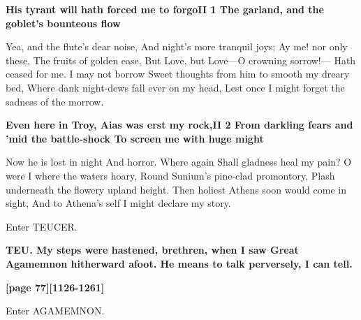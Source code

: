 \documentclass[11pt,letter]{book}
\begin{document}
\par \textbf{His tyrant will hath forced me to forgoII 1 The garland, and the goblet’s bounteous flow}
\par   Yea, and the flute’s dear noise, And night’s more tranquil joys; Ay me! nor only these, The fruits of golden ease, But Love, but Love—O crowning sorrow!— Hath ceased for me. I may not borrow Sweet thoughts from him to smooth my dreary bed, Where dank night-dews fall ever on my head, Lest once I might forget the sadness of the morrow.

\par \textbf{Even here in Troy, Aias was erst my rock,II 2 From darkling fears and ’mid the battle-shock To screen me with huge might}
\par   Now he is lost in night And horror. Where again Shall gladness heal my pain? O were I where the waters hoary, Round Sunium’s pine-clad promontory, Plash underneath the flowery upland height. Then holiest Athens soon would come in sight, And to Athena’s self I might declare my story.

\par  Enter TEUCER.

\par \textbf{TEU. My steps were hastened, brethren, when I saw Great Agamemnon hitherward afoot. He means to talk perversely, I can tell.}
\par 

\par \textbf{[page 77][1126-1261]}
\par 

\par  Enter AGAMEMNON.
\end{document}

